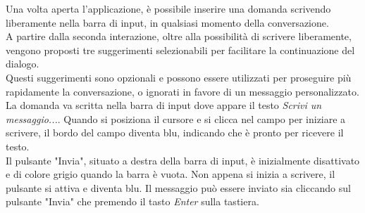 Una volta aperta l'applicazione, è possibile inserire una domanda scrivendo liberamente nella barra di input, in qualsiasi momento della conversazione.\\
A partire dalla seconda interazione, oltre alla possibilità di scrivere liberamente, vengono proposti tre suggerimenti selezionabili per facilitare la continuazione del dialogo.\\
Questi suggerimenti sono opzionali e possono essere utilizzati per proseguire più rapidamente la conversazione, o ignorati in favore di un messaggio personalizzato.\\
La domanda va scritta nella barra di input dove appare il testo \textit{Scrivi un messaggio...}. Quando si posiziona il cursore e si clicca nel campo per iniziare a scrivere, il bordo del campo diventa blu, indicando che è pronto per ricevere il testo.\\
Il pulsante "Invia", situato a destra della barra di input, è inizialmente disattivato e di colore grigio quando la barra è vuota. Non appena si inizia a scrivere, il pulsante si attiva e diventa blu.
Il messaggio può essere inviato sia cliccando sul pulsante "Invia" che premendo il tasto \textit{Enter} sulla tastiera.  

